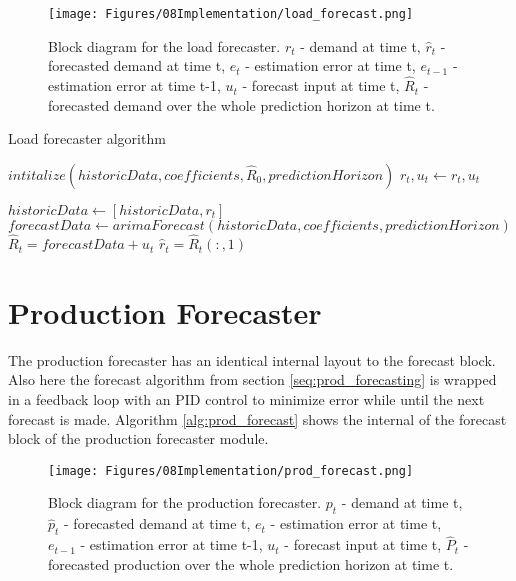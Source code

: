 \begin{figure}
    \centering
    \texttt{[image: Figures/08Implementation/load\_forecast.png]}
    \caption[Load forecaster block diagram]{Block diagram for the load forecaster. $r_t$ - demand at time t, $\hat{r}_t$ - forecasted demand at time t, $e_t$ - estimation error at time t, $e_{t-1}$ - estimation error at time t-1, $u_t$ - forecast input at time t, $\hat{R}_t$ - forecasted demand over the whole prediction horizon at time t.}
    \label{fig:load_forecaster_block}
\end{figure}

\begin{algorithm}
\caption{Load forecaster algorithm}\label{alg:load_forecast}
\begin{algorithmic}
    \State$intitalize(historicData, coefficients,\hat{R}_0,predictionHorizon) $
    \State$r_t,u_t  \gets r_t, u_t $

    \State$historicData \gets [historicData,r_t]$
    \State$forecastData \gets arimaForecast(historicData,coefficients,predictionHorizon)$
\EndIf
    \State$\hat{R}_t = forecastData + u_t $
    \State$\hat{r}_t = \hat{R}_t(:,1)$
\end{algorithmic}
\end{algorithm}

\section{Production Forecaster}
The production forecaster has an identical internal layout to the forecast block. Also here the forecast algorithm from section \ref{seq:prod_forecasting} is wrapped in a feedback loop with an PID control to minimize error while until the next forecast is made. Algorithm \ref{alg:prod_forecast} shows the internal of the forecast block of the production forecaster module.

\begin{figure}
    \centering
    \texttt{[image: Figures/08Implementation/prod\_forecast.png]}
    \caption[Production forecaster block diagram]{Block diagram for the production forecaster. $p_t$ - demand at time t, $\hat{p}_t$ - forecasted demand at time t, $e_t$ - estimation error at time t, $e_{t-1}$ - estimation error at time t-1, $u_t$ - forecast input at time t, $\hat{P}_t$ - forecasted production over the whole prediction horizon at time t.}
    \label{fig:prod_forecaster_block}
\end{figure}

